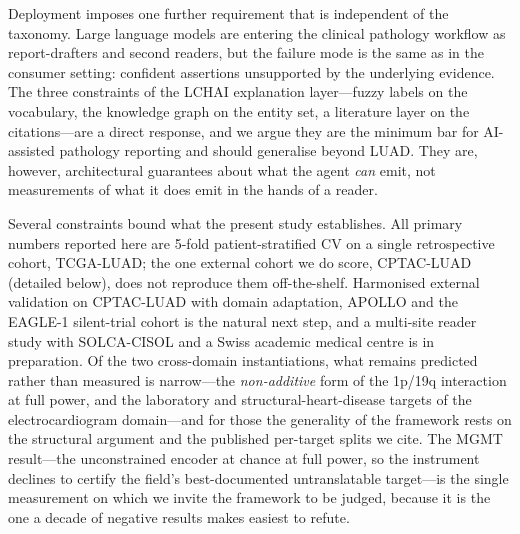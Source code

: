 \begin{table}[htbp]
\centering

\caption{Empirical domain-C run: physiological-state translation on
PTB-XL. Both targets are Conclusive and encoder-saturated (regime~(i)),
reproducing the LUAD machinery in a different modality family.}
\label{tab:ecg_domainc}
\end{table}

Deployment imposes one further requirement that is independent of the
taxonomy.
Large language models are entering the clinical pathology workflow
as report-drafters and second readers, but the failure mode is
the same as in the consumer setting: confident assertions
unsupported by the underlying evidence.
The three constraints of the LCHAI explanation layer---fuzzy labels on the
vocabulary, the knowledge graph on the entity set, a literature layer on the
citations---are a direct response, and we argue they are the minimum bar for
AI-assisted pathology reporting and should generalise beyond LUAD. They are,
however, architectural guarantees about what the agent \emph{can} emit, not
measurements of what it does emit in the hands of a reader.

Several constraints bound what the present study establishes.
All primary numbers reported here are 5-fold patient-stratified CV on
a single retrospective cohort, TCGA-LUAD; the one external cohort we do
score, CPTAC-LUAD (detailed below), does not reproduce them off-the-shelf.
Harmonised external validation on CPTAC-LUAD with domain adaptation,
APOLLO and the EAGLE-1 silent-trial cohort is the natural next step, and a
multi-site reader study with SOLCA-CISOL and a Swiss academic medical
centre is in preparation.
Of the two cross-domain instantiations, what remains predicted rather than
measured is narrow---the \emph{non-additive} form of the 1p/19q interaction
at full power, and the laboratory and structural-heart-disease targets of the
electrocardiogram domain---and for those the generality of the framework
rests on the structural argument and the published per-target splits we cite.
The MGMT result---the unconstrained encoder at chance at full power, so the
instrument declines to certify the field's best-documented untranslatable
target---is the single measurement on which we invite the framework to be
judged, because it is the one a decade of negative results makes easiest to
refute.

